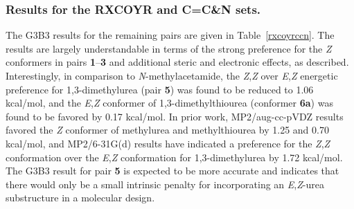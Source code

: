 \documentclass[12pt]{report}
\def\tablab{Table}\def\tabslab{\tablab s}
\newcommand*\tbl[1]{\tablab~\ref{#1}}
\begin{document}
\subsubsection{Results for the RXCOYR and C=C\&N sets.}

The G3B3 results for the remaining pairs are given in \tbl{rxcoyrccn}. The results are largely understandable in terms of the strong preference for the \textit{Z} conformers in pairs \textbf{1}--\textbf{3} and additional steric and electronic effects, as described. Interestingly, in comparison to \textit{N}-methylacetamide, the \textit{Z},\textit{Z} over \textit{E},\textit{Z} energetic preference for 1,3-dimethylurea (pair \textbf{5}) was found to be reduced to 1.06 kcal/mol, and the \textit{E},\textit{Z} conformer of 1,3-dimethylthiourea (conformer \textbf{6a}) was found to be favored by 0.17 kcal/mol. In prior work, MP2/aug-cc-pVDZ results favored the \textit{Z} conformer of methylurea and methylthiourea by 1.25 and 0.70 kcal/mol,\cite{bry,bry2} and MP2/6-31G(d) results have indicated a preference for the \textit{Z},\textit{Z} conformation over the \textit{E},\textit{Z} conformation for 1,3-dimethylurea by 1.72 kcal/mol.\cite{strassner} The G3B3 result for pair \textbf{5} is expected to be more accurate and indicates that there would only be a small intrinsic penalty for incorporating an \textit{E},\textit{Z}-urea substructure in a molecular design.
\end{document}
